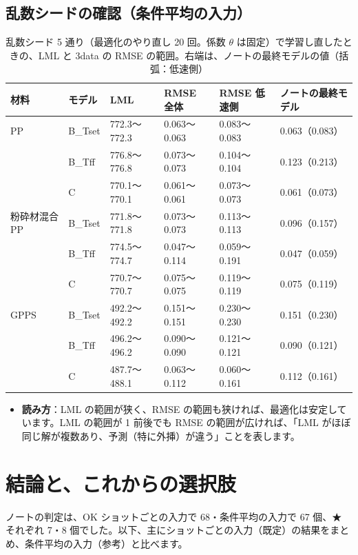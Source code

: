 \documentclass[paper=a4paper,fontsize=10.5pt,line_length=44zw,number_of_lines=38]{jlreq}
\newenvironment{points}{\begin{itemize}[label=$\triangleright$,leftmargin=1.5\zw,itemsep=0.3ex,topsep=0.5ex,parsep=0pt]}{\end{itemize}}
\newcommand{\pt}[1]{\item \textbf{#1}：}
\begin{document}
\subsection{乱数シードの確認（条件平均の入力）}
\begin{table}[H]
\caption{乱数シード 5 通り（最適化のやり直し 20 回。係数 $\theta$ は固定）で学習し直したときの、LML と 3data の RMSE の範囲。右端は、ノートの最終モデルの値（括弧：低速側）}\label{tab:seed}
\scriptsize
\begin{tabularx}{\linewidth}{@{}llXXXX@{}}
\toprule
材料 & モデル & LML & RMSE 全体 & RMSE 低速側 & ノートの最終モデル \\
\midrule
PP & B\_Tset & 772.3〜772.3 & 0.063〜0.063 & 0.083〜0.083 & 0.063（0.083） \\
 & B\_Tff & 776.8〜776.8 & 0.073〜0.073 & 0.104〜0.104 & 0.123（0.213） \\
 & C & 770.1〜770.1 & 0.061〜0.061 & 0.073〜0.073 & 0.061（0.073） \\
\midrule
粉砕材混合 PP & B\_Tset & 771.8〜771.8 & 0.073〜0.073 & 0.113〜0.113 & 0.096（0.157） \\
 & B\_Tff & 774.5〜774.7 & 0.047〜0.114 & 0.059〜0.191 & 0.047（0.059） \\
 & C & 770.7〜770.7 & 0.075〜0.075 & 0.119〜0.119 & 0.075（0.119） \\
\midrule
GPPS & B\_Tset & 492.2〜492.2 & 0.151〜0.151 & 0.230〜0.230 & 0.151（0.230） \\
 & B\_Tff & 496.2〜496.2 & 0.090〜0.090 & 0.121〜0.121 & 0.090（0.121） \\
 & C & 487.7〜488.1 & 0.063〜0.112 & 0.060〜0.161 & 0.112（0.161） \\

\bottomrule
\end{tabularx}
\end{table}
\begin{points}
\pt{読み方}LML の範囲が狭く、RMSE の範囲も狭ければ、最適化は安定しています。LML の範囲が 1 前後でも RMSE の範囲が広ければ、「LML がほぼ同じ解が複数あり、予測（特に外挿）が違う」ことを表します。
\end{points}


\section{結論と、これからの選択肢}


ノートの判定は、OK ショットごとの入力で 68・条件平均の入力で 67 個、★ それぞれ 7・8 個でした。以下、主にショットごとの入力（既定）の結果をまとめ、条件平均の入力（参考）と比べます。
\end{document}
